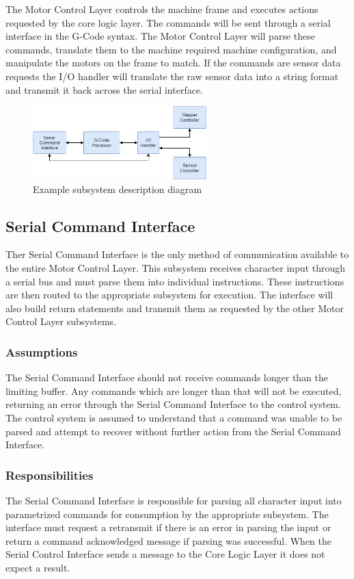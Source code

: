The Motor Control Layer controls the machine frame and executes actions requested by the core logic layer. The commands will be sent through a serial interface in the G-Code syntax. The Motor Control Layer will parse these commands, translate them to the machine required machine configuration, and manipulate the motors on the frame to match. If the commands are sensor data requests the I/O handler will translate the raw sensor data into a string format and transmit it back across the serial interface.

\begin{figure}[h!]
	\centering
 	\includegraphics[width=0.60\textwidth]{images/motor_control_layer}
 \caption{Example subsystem description diagram}
\end{figure}

\subsection{Serial Command Interface}
Ther Serial Command Interface is the only method of communication available to the entire Motor Control Layer. This subsystem receives character input through a serial bus and must parse them into individual instructions. These instructions are then routed to the appropriate subsystem for execution. The interface will also build return statements and transmit them as requested by the other Motor Control Layer subsystems. 

\subsubsection{Assumptions}
The Serial Command Interface should not receive commands longer than the limiting buffer. Any commands which are longer than that will not be executed, returning an error through the Serial Command Interface to the control system. The control system is assumed to understand that a command was unable to be parsed and attempt to recover without further action from the Serial Command Interface.

\subsubsection{Responsibilities}
The Serial Command Interface is responsible for parsing all character input into parametrized commands for consumption by the appropriate subsystem. The interface must request a retransmit if there is an error in parsing the input or return a command acknowledged message if parsing was successful. When the Serial Control Interface sends a message to the Core Logic Layer it does not expect a result. 


